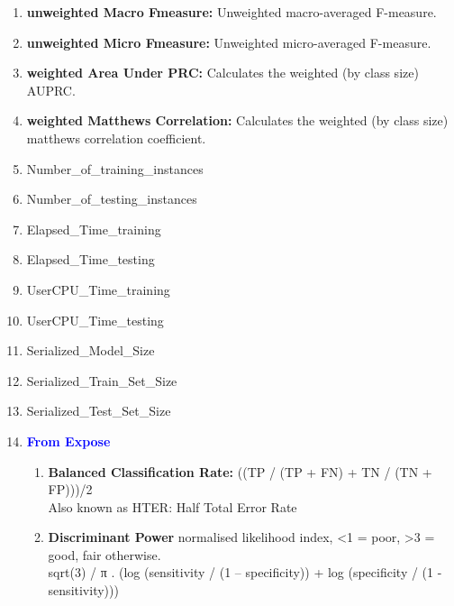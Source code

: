 \documentclass[a4paper,12pt, english]{article}
\begin{document}
\begin{enumerate}
\item \textbf{unweighted Macro Fmeasure: }
          Unweighted macro-averaged F-measure.
          
\item \textbf{unweighted Micro Fmeasure: }
          Unweighted micro-averaged F-measure.          

\item \textbf{weighted Area Under PRC: }
          Calculates the weighted (by class size) AUPRC.


          
\item \textbf{weighted Matthews Correlation: }
          Calculates the weighted (by class size) matthews correlation coefficient.
          
\item Number\_of\_training\_instances

\item Number\_of\_testing\_instances          

\item Elapsed\_Time\_training

\item Elapsed\_Time\_testing

\item UserCPU\_Time\_training

\item UserCPU\_Time\_testing
    
\item Serialized\_Model\_Size

\item Serialized\_Train\_Set\_Size

\item Serialized\_Test\_Set\_Size
	    


\item  \textbf{\textcolor{blue}{From Expose}}
\begin{enumerate}          
\item \textbf{Balanced Classification Rate: }
((TP / (TP + FN) + TN / (TN + FP)))/2\\
Also known as HTER: Half Total Error Rate

          
\item \textbf{Discriminant Power }
          normalised likelihood index, <1 = poor, >3 = good, fair otherwise. \\
sqrt(3) / π . (log (sensitivity / (1 – specificity)) + log (specificity / (1 - sensitivity)))


\end{enumerate}
\end{enumerate}
\end{document}
